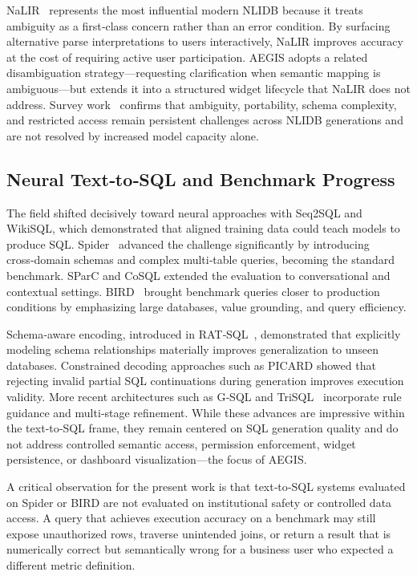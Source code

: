\documentclass[11pt]{article}
\begin{document}
NaLIR~\cite{li2014nalir} represents the most influential modern NLIDB because it treats ambiguity as a first‑class concern rather than an error condition. By surfacing alternative parse interpretations to users interactively, NaLIR improves accuracy at the cost of requiring active user participation. AEGIS adopts a related disambiguation strategy—requesting clarification when semantic mapping is ambiguous—but extends it into a structured widget lifecycle that NaLIR does not address. Survey work~\cite{affolter2019survey,liu2026systematic} confirms that ambiguity, portability, schema complexity, and restricted access remain persistent challenges across NLIDB generations and are not resolved by increased model capacity alone.

\subsection{Neural Text‑to‑SQL and Benchmark Progress}
The field shifted decisively toward neural approaches with Seq2SQL and WikiSQL\cite{zhong2018seq2sql}, which demonstrated that aligned training data could teach models to produce SQL. Spider~\cite{yu2018spider} advanced the challenge significantly by introducing cross‑domain schemas and complex multi‑table queries, becoming the standard benchmark. SParC and CoSQL\cite{yu2019sparc,yu2019cosql} extended the evaluation to conversational and contextual settings. BIRD~\cite{li2023bigbench} brought benchmark queries closer to production conditions by emphasizing large databases, value grounding, and query efficiency.

Schema‑aware encoding, introduced in RAT‑SQL~\cite{wang2020ratsql}, demonstrated that explicitly modeling schema relationships materially improves generalization to unseen databases. Constrained decoding approaches such as PICARD\cite{scholak2021picard} showed that rejecting invalid partial SQL continuations during generation improves execution validity. More recent architectures such as G‑SQL\cite{shalaan2025gsql} and TriSQL~\cite{su2026trisql} incorporate rule guidance and multi‑stage refinement. While these advances are impressive within the text‑to‑SQL frame, they remain centered on SQL generation quality and do not address controlled semantic access, permission enforcement, widget persistence, or dashboard visualization—the focus of AEGIS.

A critical observation for the present work is that text‑to‑SQL systems evaluated on Spider or BIRD are not evaluated on institutional safety or controlled data access. A query that achieves execution accuracy on a benchmark may still expose unauthorized rows, traverse unintended joins, or return a result that is numerically correct but semantically wrong for a business user who expected a different metric definition.
\end{document}
